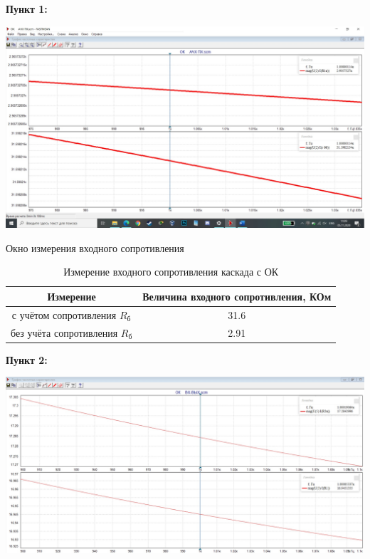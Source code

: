 \documentclass[a4paper,14pt]{extarticle}
\begin{document}
    \textbf{Пункт 1:}
    \begin{center}
        \includegraphics[scale=0.25]{1.jpg}
    \end{center}

    Окно измерения входного сопротивления 
    \begin{table}[ht]
        \begin{center}
            \caption{Измерение входного сопротивления каскада с ОК}
            \begin{tabular}{ |c|c| }
                \hline
                Измерение & Величина входного сопротивления, КОм\\
                \hline
                с учётом сопротивления $R_{\text{б}}$ & 31.6\\
                \hline
                без учёта сопротивления $R_{\text{б}}$ & 2.91\\
                \hline
            \end{tabular}
        \end{center}
    \end{table}

    \newpage
    \textbf{Пункт 2:}
    \begin{center}
        \includegraphics[scale=0.25]{2.jpg}
    \end{center}
\end{document}
